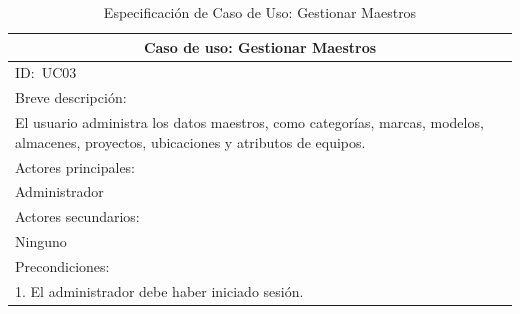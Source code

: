 \documentclass[stu, 12pt, letterpaper, donotrepeattitle, floatsintext, natbib]{apa7}
\begin{document}
\newpage
\begin{longtable}{@{} p{16.5cm} @{}}
    \caption{Especificación de Caso de Uso: Gestionar Maestros}\label{tab:UC03}                                                                                                              \\ \toprule
    \multicolumn{1}{c}{Caso de uso: Gestionar Maestros}                                                                                                                                      \\ \midrule
    ID:~UC03                                                                                                                                                                                 \\ \midrule
    Breve descripción:                                                                                                                                                                       \\
    El usuario administra los datos maestros, como categorías, marcas, modelos, almacenes, proyectos, ubicaciones y atributos de equipos.                                                    \\ \midrule
    Actores principales:                                                                                                                                                                     \\
    Administrador                                                                                                                                                                            \\ \midrule
    Actores secundarios:                                                                                                                                                                     \\
    Ninguno                                                                                                                                                                                  \\ \midrule
    Precondiciones:                                                                                                                                                                          \\
    1. El administrador debe haber iniciado sesión.                                                                                                                                          \\ \midrule

\end{longtable}
\end{document}

